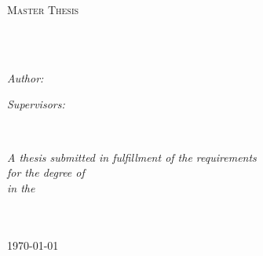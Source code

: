 \documentclass[
11pt, %
english, %
singlespacing, %
headsepline, %
]{MastersThesis} %
\author{Janik V. \textsc{Hrubant}} %
\theoremstyle{definition}
\theoremstyle{plain}
\theoremstyle{remark}
\theoremstyle{remark}
\begin{document}
\frontmatter %

\pagestyle{plain} %


\begin{titlepage}
\begin{center}

\vspace*{.06\textheight}
{\scshape\LARGE \univname\par}\vspace{1.5cm} %
\textsc{\Large Master Thesis}\\[0.5cm] %

\HRule \\[0.4cm] %
{\huge \bfseries \ttitle\par}\vspace{0.4cm} %
\HRule \\[1.5cm] %
 
\begin{minipage}[t]{0.4\textwidth}
\begin{flushleft} \large
\emph{Author:}\\
\authorname %
\end{flushleft}
\end{minipage}
\begin{minipage}[t]{0.4\textwidth}
\begin{flushright} \large
\emph{Supervisors:} \\
\supname %
\end{flushright}
\end{minipage}\\[3cm]
 
\vfill

\large \textit{A thesis submitted in fulfillment of the requirements\\ for the degree of \degreename}\\[0.3cm] %
\textit{in the}\\[0.4cm]
\groupname\\\deptname\\[2cm] %
 
\vfill

{\large \today}\\[4cm] %
 
\vfill
\end{center}
\end{titlepage}
\end{document}
